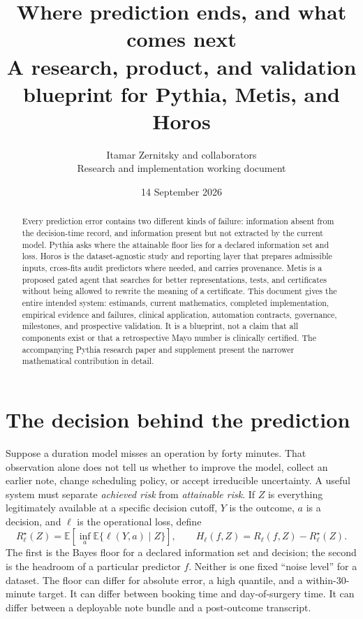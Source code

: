 \documentclass[11pt]{article}
\title{\vspace{-1em}\textcolor{ink}{\bfseries Where prediction ends, and what comes next}\\[0.45em]
\large A research, product, and validation blueprint for Pythia, Metis, and Horos}
\author{Itamar Zernitsky and collaborators\\\small Research and implementation working document}
\date{14 September 2026}
\newcommand{\Rstar}{R^{\star}}
\begin{document}
\maketitle
\begin{abstract}
Every prediction error contains two different kinds of failure: information absent from the decision-time record, and information present but not extracted by the current model. Pythia asks where the attainable floor lies for a declared information set and loss. Horos is the dataset-agnostic study and reporting layer that prepares admissible inputs, cross-fits audit predictors where needed, and carries provenance. Metis is a proposed gated agent that searches for better representations, tests, and certificates without being allowed to rewrite the meaning of a certificate. This document gives the entire intended system: estimands, current mathematics, completed implementation, empirical evidence and failures, clinical application, automation contracts, governance, milestones, and prospective validation. It is a blueprint, not a claim that all components exist or that a retrospective Mayo number is clinically certified. The accompanying Pythia research paper and supplement present the narrower mathematical contribution in detail.
\end{abstract}
\tableofcontents
\clearpage

\section{The decision behind the prediction}
Suppose a duration model misses an operation by forty minutes. That observation alone does not tell us whether to improve the model, collect an earlier note, change scheduling policy, or accept irreducible uncertainty. A useful system must separate \emph{achieved risk} from \emph{attainable risk}. If $Z$ is everything legitimately available at a specific decision cutoff, $Y$ is the outcome, $a$ is a decision, and $\ell$ is the operational loss, define
\begin{equation}
\Rstar_{\ell}(Z)=\mathbb E\left[\inf_a\mathbb E\{\ell(Y,a)\mid Z\}\right],\qquad
H_{\ell}(f,Z)=R_{\ell}(f,Z)-\Rstar_{\ell}(Z).
\end{equation}
The first is the Bayes floor for a declared information set and decision; the second is the headroom of a particular predictor $f$. Neither is one fixed ``noise level'' for a dataset. The floor can differ for absolute error, a high quantile, and a within-30-minute target. It can differ between booking time and day-of-surgery time. It can differ between a deployable note bundle and a post-outcome transcript.
\end{document}
